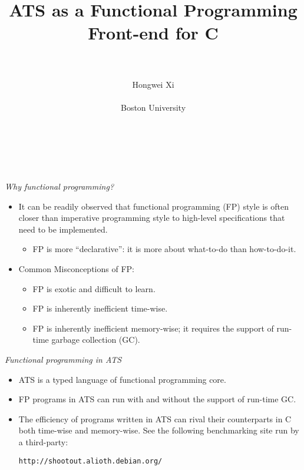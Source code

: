 \documentclass[pdf]{prosper}
\title{\huge\bf ATS as a Functional Programming Front-end for C}
\author{~\\~\\
{\large Hongwei Xi} \\~\\
{\large Boston University} \\~\\~\\~\\
\institution{Work partly funded by NSF}}
\begin{document}
\maketitle
\begin{slide}{\em Why functional programming?}
\begin{itemize}
\item
It can be readily observed that functional programming (FP) style is often
closer than imperative programming style to high-level specifications that
need to be implemented.

\begin{itemize}
\item FP is more ``declarative'': it is more about what-to-do than how-to-do-it.
\end{itemize}

\item
Common Misconceptions of FP:
\begin{itemize}
\item FP is exotic and difficult to learn.
\item FP is inherently inefficient time-wise.
\item FP is inherently inefficient memory-wise; it requires the support of run-time garbage collection (GC).
\end{itemize}

\end{itemize}
\end{slide}
\begin{slide}{\em Functional programming in ATS}
\begin{itemize}
\item ATS is a typed language of functional programming core.
\item FP programs in ATS can run with and without the support of run-time GC.
\item
The efficiency of programs written in ATS can rival their counterparts in
C both time-wise and memory-wise. See the following benchmarking site
run by a third-party:
\begin{center}
\texttt{http://shootout.alioth.debian.org/}
\end{center}
\end{itemize}
\end{slide}
\end{document}
